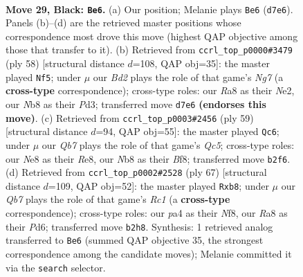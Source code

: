 \documentclass[11pt]{article}
\begin{document}
\clearpage

\begin{figure}[p]\centering
\begin{subfigure}{0.46\textwidth}\centering
\resizebox{\linewidth}{!}{%
\newchessgame
\chessboard[
  setfen={rn2nk2/1p1b3p/7p/p1P2p1P/P6P/1N3B2/1q6/RN1Q2K1 b - - 2 29},
  showmover=false,
  pgfstyle=straightmove, color=movearrow, markmove={d7-e6}
]}
\caption{}
\end{subfigure}\hfill
\begin{subfigure}{0.46\textwidth}\centering
\resizebox{\linewidth}{!}{%
\newchessgame
\chessboard[
  setfen={5k1r/1b2bpN1/pq5P/3n4/2Qp1B2/3P3R/1P2N3/5K2 w - - 5 30},
  showmover=false,
  pgfstyle=straightmove, color=movearrow, markmove={g7-f5}
]}
\caption{}
\end{subfigure}
\\[4pt]
\begin{subfigure}{0.46\textwidth}\centering
\resizebox{\linewidth}{!}{%
\newchessgame
\chessboard[
  setfen={4rbk1/Bb3p2/5n1p/1R2p1p1/2q3P1/2N4P/4PP2/R1Q3K1 b - - 0 30},
  showmover=false,
  pgfstyle=straightmove, color=movearrow, markmove={c4-c6}
]}
\caption{}
\end{subfigure}\hfill
\begin{subfigure}{0.46\textwidth}\centering
\resizebox{\linewidth}{!}{%
\newchessgame
\chessboard[
  setfen={1Rr2nk1/7p/3p1b2/8/3Pp1p1/3qB1P1/4NP2/4RQK1 b - - 0 34},
  showmover=false,
  pgfstyle=straightmove, color=movearrow, markmove={c8-b8}
]}
\caption{}
\end{subfigure}
\caption{\textbf{Move 29, Black: \texttt{Be6}.} (a) Our position; Melanie plays \texttt{Be6} (\texttt{d7e6}). Panels (b)--(d) are the retrieved master positions whose correspondence most drove this move (highest QAP objective among those that transfer to it). (b) Retrieved from \texttt{ccrl\_top\_p0000\#3479} (ply 58) [structural distance $d$=108, QAP obj=35]: the master played \texttt{Nf5}; under $\mu$ our \emph{Bd2} plays the role of that game's \emph{Ng7} (a \textbf{cross-type} correspondence); cross-type roles: our \emph{R}a8 as their \emph{N}e2, our \emph{N}b8 as their \emph{P}d3; transferred move \texttt{d7e6} \textbf{(endorses this move)}. (c) Retrieved from \texttt{ccrl\_top\_p0003\#2456} (ply 59) [structural distance $d$=94, QAP obj=55]: the master played \texttt{Qc6}; under $\mu$ our \emph{Qb7} plays the role of that game's \emph{Qc5}; cross-type roles: our \emph{N}e8 as their \emph{R}e8, our \emph{N}b8 as their \emph{B}f8; transferred move \texttt{b2f6}. (d) Retrieved from \texttt{ccrl\_top\_p0002\#2528} (ply 67) [structural distance $d$=109, QAP obj=52]: the master played \texttt{Rxb8}; under $\mu$ our \emph{Qb7} plays the role of that game's \emph{Rc1} (a \textbf{cross-type} correspondence); cross-type roles: our \emph{p}a4 as their \emph{N}f8, our \emph{R}a8 as their \emph{P}d6; transferred move \texttt{b2h8}. Synthesis: 1 retrieved analog transferred to \texttt{Be6} (summed QAP objective 35, the strongest correspondence among the candidate moves); Melanie committed it via the \texttt{search} selector.}
\label{fig:thought-m57}
\end{figure}
\end{document}
